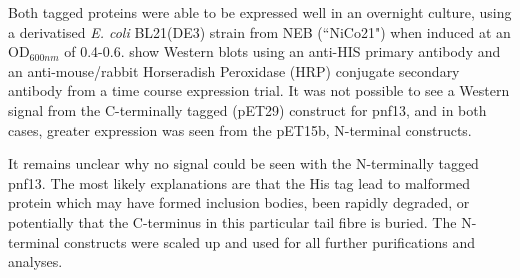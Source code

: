 Both tagged proteins were able to be expressed well in an overnight culture, using a derivatised \emph{E. coli} BL21(DE3) strain from NEB (``NiCo21") when induced at an OD$_{600 nm}$ of 0.4-0.6.  show Western blots using an anti-HIS primary antibody and an anti-mouse/rabbit Horseradish Peroxidase (HRP) conjugate secondary antibody from a time course expression trial. It was not possible to see a Western signal from the C-terminally tagged (pET29) construct for pnf13, and in both cases, greater expression was seen from the pET15b, N-terminal constructs.

It remains unclear why no signal could be seen with the N-terminally tagged pnf13. The most likely explanations are that the His tag lead to malformed protein which may have formed inclusion bodies, been rapidly degraded, or potentially that the C-terminus in this particular tail fibre is buried. The N-terminal constructs were scaled up and used for all further purifications and analyses.


